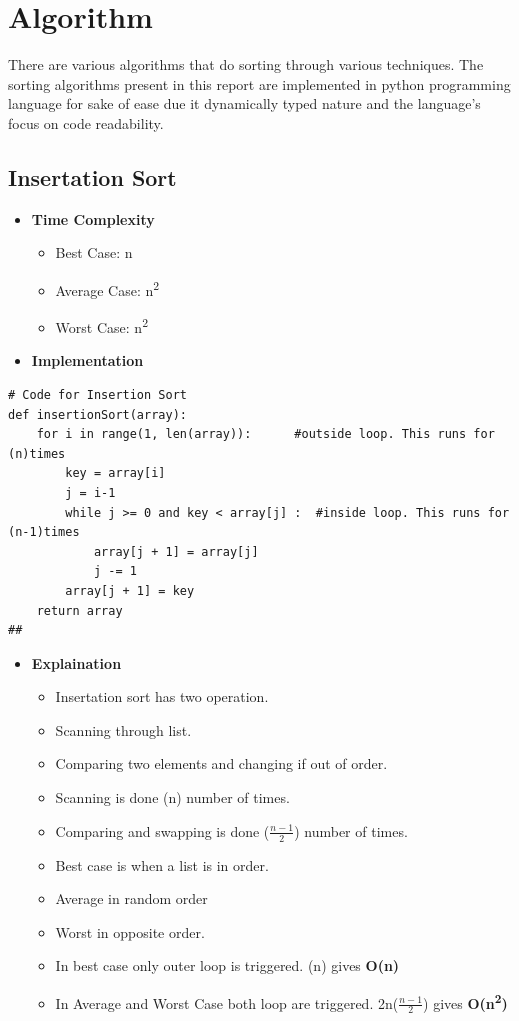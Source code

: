 \documentclass{article}
\begin{document}
\section{Algorithm}
There are various algorithms that do sorting through various techniques.
The sorting algorithms present in this report are implemented in python 
programming language for sake of ease due it dynamically typed nature 
and the language's focus on code readability.  

\subsection{Insertation Sort}
\begin{itemize}
    \item \textbf{Time Complexity}
        \begin{itemize}
            \item Best Case: n
            \item Average Case: n\textsuperscript{2}
            \item Worst Case: n\textsuperscript{2}
        \end{itemize}
    \item \textbf{Implementation}
\end{itemize}

\begin{verbatim}
# Code for Insertion Sort
def insertionSort(array):
    for i in range(1, len(array)):      #outside loop. This runs for (n)times
        key = array[i]
        j = i-1
        while j >= 0 and key < array[j] :  #inside loop. This runs for (n-1)times
            array[j + 1] = array[j]
            j -= 1
        array[j + 1] = key
    return array
##
\end{verbatim}

\begin{itemize}
    \item \textbf{Explaination}
    \begin{itemize}
        \item Insertation sort has two operation.
        \item Scanning through list.
        \item Comparing two elements and changing if out of order.
        \item Scanning is done (n) number of times.
        \item Comparing  and swapping is done (\( \frac{n-1}{2} \)) number of times.
        \item Best case is when a list is in order.
        \item Average in random order 
        \item Worst in opposite order.
        \item In best case only outer loop is triggered. (n) gives \textbf{O(n)}
        \item In Average and Worst Case both loop are triggered. 2n(\( \frac{n-1}{2} \)) gives \textbf{O(n\textsuperscript{2})}
    \end{itemize}
\end{itemize}
\clearpage
\end{document}
